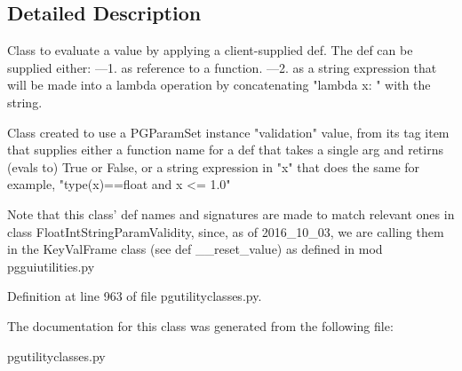 \subsection{Detailed Description}
\begin{DoxyVerb}Class to evaluate a value by applying
a client-supplied def.  The def can be
supplied either:
---1. as reference to a function.
---2. as a string expression
that will be made into a lambda operation
by concatenating "lambda x: "
with the string. 

Class created to use a PGParamSet instance "validation"
value, from its tag item that
supplies either a function name for a def that 
takes a single arg and retirns (evals to) True or False, 
or a string expression in "x" that does the same
for example, "type(x)==float and x <= 1.0"

Note that this class' def names and signatures are made
to match relevant ones in class FloatIntStringParamValidity,
since, as of 2016_10_03, we are calling them in the KeyValFrame
class (see def __reset_value) as defined in mod pgguiutilities.py
\end{DoxyVerb}
 

Definition at line 963 of file pgutilityclasses.\+py.



The documentation for this class was generated from the following file\+:\begin{DoxyCompactItemize}
\item 
pgutilityclasses.\+py\end{DoxyCompactItemize}
